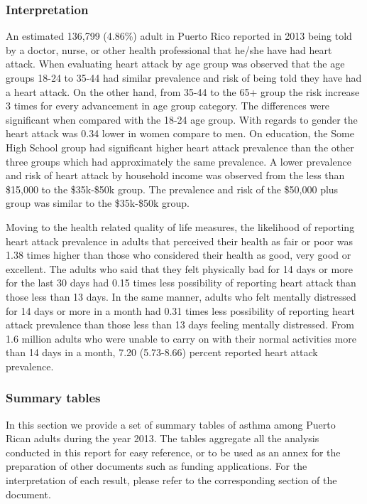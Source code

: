 \newpage
 \subsubsection{Interpretation}

An estimated 136,799 (4.86\%) adult in Puerto Rico reported in 2013 being told by a doctor, nurse, or other health professional that he/she have had heart attack. When evaluating heart attack by age group was observed that the age groups 18-24 to 35-44 had similar prevalence and risk of being told they have had a heart attack. On the other hand, from 35-44 to the 65+ group the risk increase 3 times for every advancement in age group category. The differences were significant when compared with the 18-24 age group. With regards to gender the heart attack was 0.34 lower in women compare to men. On education, the Some High School group had significant higher heart attack prevalence than the other three groups which had approximately the same prevalence. A lower prevalence and risk of heart attack by household income was observed from the less than \$15,000 to the \$35k-\$50k group.  The prevalence and risk of the \$50,000 plus group was similar to the \$35k-\$50k group.

Moving to the health related quality of life measures, the likelihood of reporting heart attack prevalence in adults that perceived their health as fair or poor was 1.38 times higher than those who considered their health as good, very good or excellent. The adults who said that they felt physically bad for 14 days or more for the last 30 days had 0.15 times less possibility of reporting heart attack than those less than 13 days. In the same manner, adults who felt mentally distressed for 14 days or more in a month had 0.31 times less possibility of reporting heart attack prevalence than those less than 13 days feeling mentally distressed. From 1.6 million adults who were unable to carry on with their normal activities more than 14 days in a month, 7.20 (5.73-8.66) percent reported heart attack prevalence. 



\newpage
\subsubsection{Summary tables}
In this section we provide a set of summary tables of asthma among Puerto Rican adults during the year 2013. The tables aggregate all the analysis conducted in this report for easy reference, or to be used as an annex for the preparation of other documents such as funding applications. For the interpretation of each result, please refer to the corresponding section of the document.


